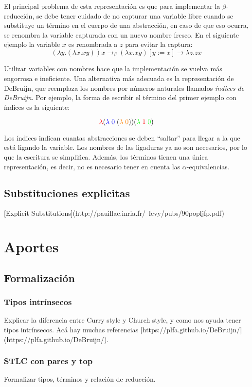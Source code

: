 \documentclass[]{report}
\begin{document}
	El principal problema de esta representación es que para implementar la $\beta$-reducción, se debe tener cuidado de no capturar una variable libre cuando se substituye un término en el cuerpo de una abstracción, en caso de que eso ocurra, se renombra la variable capturada con un nuevo nombre fresco.
	En el siguiente ejemplo la variable $x$ es renombrada a $z$ para evitar la captura:
	\[ (\lambda y. (\lambda x. x y)) x \rightarrow_{\beta} (\lambda x. x y)[y := x] \rightarrow \lambda z. z x \]
	
	Utilizar variables con nombres hace que la implementación se vuelva más engorrosa e ineficiente.
	Una alternativa más adecuada es la representación de DeBruijn, que reemplaza los nombres por números naturales llamados \textit{índices de DeBruijn}.
	Por ejemplo, la forma de escribir el término del primer ejemplo con índices es la siguiente:
	
	\[ \textcolor{red}{\lambda} (\textcolor{blue}{\lambda\; 0} \; (\textcolor{orange}{\lambda\; 0})) (\textcolor{green}{\lambda}\; \textcolor{red}{1} \; \textcolor{green}{0}) \]

	Los índices indican cuantas abstracciones se deben ``saltar'' para llegar a la que está ligando la variable.
	Los nombres de las ligaduras ya no son necesarios, por lo que la escritura se simplifica.
	Además, los términos tienen una única representación, es decir, no es necesario tener en cuenta las $\alpha$-equivalencias.
	
	
	\section{Substituciones explicitas}
	[Explicit Substitutions](http://pauillac.inria.fr/~levy/pubs/90popljfp.pdf)
	
	
	\chapter{Aportes}
	\section{Formalización}
	\subsection{Tipos intrínsecos}
	Explicar la diferencia entre Curry style y Church style, y como nos ayuda tener tipos intrínsecos. Acá hay muchas referencias
	[https://plfa.github.io/DeBruijn/] (https://plfa.github.io/DeBruijn/).
	\subsection{STLC con pares y top}
	Formalizar tipos, términos y relación de reducción.
\end{document}
